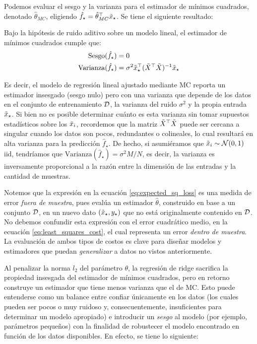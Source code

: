Podemos evaluar el sesgo y la varianza para el estimador de mínimos cuadrados, denotado $\hat\theta_{MC}$, eligiendo $\hat f_\star = \hat\theta_{MC}^\top\tilde{x}_\star$. Se tiene el siguiente resultado:

\begin{theorem} Bajo la hipótesis de ruido aditivo sobre un modelo lineal, el estimador de mínimos cuadrados cumple que:
	\begin{align}
	\text{Sesgo}(\hat f_\star) &= 0\\
	\text{Varianza}(\hat f_\star) &= \sigma^2 \tilde{x}_\star^\top (\tilde{X}^\top\tilde{X})^{-1}	\tilde{x}_\star
\end{align}
\end{theorem}

Es decir, el modelo de regresión lineal ajustado mediante MC reporta un estimador insesgado (sesgo nulo) pero con una varianza que depende de los datos en el conjunto de entrenamiento ${\mathcal D}$, la varianza del ruido $\sigma^2$ y la propia entrada $\tilde{x}_\star$. Si bien no es posible determinar cuánto es esta varianza sin tomar supuestos estadísticos sobre los $\tilde{x}_i$, recordemos que la matriz $\tilde{X}^\top\tilde{X}$ puede ser cercana a singular cuando los datos son pocos, redundantes o colineales, lo cual resultará en alta varianza para la predicción $\hat f_\star$. De hecho, si asumiéramos que $\tilde{x}_i\sim{\mathcal N}(0,1)$ iid, tendríamos que $\text{Varianza}(\hat f_\star) = \sigma^2 M/N$, es decir, la varianza es inversamente proporcional a la razón entre la dimensión de las entradas y la cantidad de muestras.\\

\begin{mdframed}[style=discusion, frametitle={\center Evaluaciones \emph{dentro de muestra} y \emph{fuera de muestra}}]
 Notemos que la expresión en la ecuación \eqref{eq:expected_sq_loss} es una medida de error \emph{fuera de muestra}, pues evalúa un estimador $\hat\theta$, construido en base a un conjunto ${\mathcal D}$, en un nuevo dato $(\tilde{x}_\star,y_\star)$ que no está originalmente contenido en ${\mathcal D}$. No debemos confundir esta expresión con el error cuadrático medio, en la ecuación \eqref{eq:least_squares_cost}, el cual representa un error \emph{dentro de muestra}. La  evaluación de ambos tipos de  costos es clave para diseñar modelos y estimadores que puedan \emph{generalizar} a datos no vistos anteriormente.
\end{mdframed}

Al penalizar la norma $l_2$ del parámetro $\theta$, la regresión de ridge sacrifica la propiedad insesgada del estimador de mínimos cuadrados, pero en retorno construye un estimador que tiene menos varianza que el de MC. Esto puede entenderse como un balance entre  confiar únicamente en los datos (los cuales pueden ser pocos o muy ruidoso y, consecuentemente, insuficientes para determinar un modelo apropiado) e introducir un \emph{sesgo} al modelo (por ejemplo, parámetros pequeños) con la finalidad de robustecer el modelo encontrado en función de los datos disponibles. En efecto, se tiene lo siguiente:

